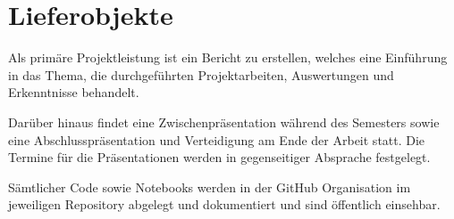 \section{Lieferobjekte}
Als primäre Projektleistung ist ein Bericht zu erstellen, welches eine Einführung in das Thema, die durchgeführten Projektarbeiten, Auswertungen und Erkenntnisse behandelt. 

Darüber hinaus findet eine Zwischenpräsentation während des Semesters sowie eine Abschlusspräsentation und Verteidigung am Ende der Arbeit statt. Die Termine für die Präsentationen werden in gegenseitiger Absprache festgelegt. 

Sämtlicher Code sowie Notebooks werden in der GitHub Organisation im jeweiligen Repository abgelegt und dokumentiert und sind öffentlich einsehbar.

